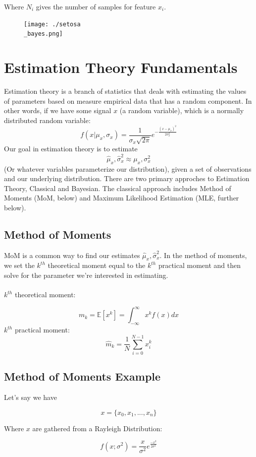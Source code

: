 \documentclass[12pt]{article}
\begin{document}
Where \(N_i\) gives the number of samples for feature \(x_i\).



\begin{figure}[H]
    \centering
    \texttt{[image: ./setosa\\\_bayes.png]} %
\end{figure}
\section{Estimation Theory Fundamentals}
Estimation theory is a branch of statistics that deals with estimating the values of parameters based on measure empirical data that has a random component. In other words, if we have some signal \(x\) (a random variable), which is a normally distributed random variable:
\[
f(x | \mu_x, \sigma_x) = \frac{1}{\sigma_x \sqrt{2\pi}} e^{-\frac{(x - \mu_x)^2}{2\sigma_x^2}}
\]
Our goal in estimation theory is to estimate 
\[\hat{\mu}_x, \hat{\sigma}^2_x \approx \mu_x, \sigma_x^2\]
(Or whatever variables parameterize our distribution), given a set of observations and our underlying distribution. There are two primary approches to Estimation Theory, Classical and Bayesian. The classical approach includes Method of Moments (MoM, below) and Maximum Likelihood Estimation (MLE, further below).
\subsection{Method of Moments}
MoM is a common way to find our estimates \(\hat{\mu}_x, \hat{\sigma}^2_x\). In the method of moments, we set the \(k^{th}\) theoretical moment equal to the \(k^{th}\) practical moment and then solve for the parameter we're interested in estimating. \\\\
\(k^{th}\) theoretical moment:

\[m_k = \mathbb{E}[x^k] = \int_{-\infty}^{\infty}x^k f(x) dx\]
\(k^{th}\) practical moment: 
\[\hat{m}_k = \frac{1}{N}\sum_{i=0}^{N-1}x_i^k\]

\subsection{Method of Moments Example}
Let's say we have 

\[x = \{x_0, x_1,...,x_n\}\]

Where \(x\) are gathered from a Rayleigh Distribution:

\[f(x; \sigma^2) = \frac{x}{\sigma^2}e^{\frac{-x^2}{2\sigma^2}}\]
\end{document}

